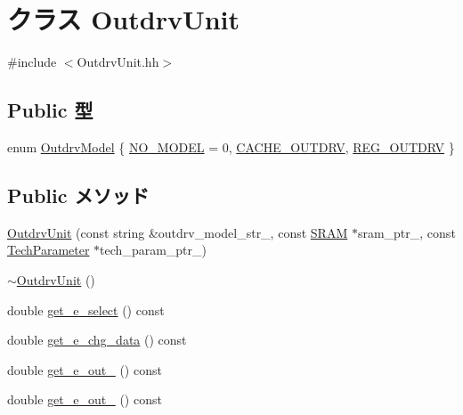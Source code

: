 \hypertarget{classOutdrvUnit}{
\section{クラス OutdrvUnit}
\label{classOutdrvUnit}
}


{\ttfamily \#include $<$OutdrvUnit.hh$>$}\subsection*{Public 型}
\begin{DoxyCompactItemize}
\item 
enum \hyperlink{classOutdrvUnit_acf5fc301c3542e694b0cec063a8d92c5}{OutdrvModel} \{ \hyperlink{classOutdrvUnit_acf5fc301c3542e694b0cec063a8d92c5abab57b6e2c553e4d983f415a1f4ea75b}{NO\_\-MODEL} =  0, 
\hyperlink{classOutdrvUnit_acf5fc301c3542e694b0cec063a8d92c5a3df5c379101c3477a485f8ba66b8b0d9}{CACHE\_\-OUTDRV}, 
\hyperlink{classOutdrvUnit_acf5fc301c3542e694b0cec063a8d92c5a2255e429b4b343fb912571ab95335e89}{REG\_\-OUTDRV}
 \}
\end{DoxyCompactItemize}
\subsection*{Public メソッド}
\begin{DoxyCompactItemize}
\item 
\hyperlink{classOutdrvUnit_a4f6cb5a4cdeb7f2641aafac67261694d}{OutdrvUnit} (const string \&outdrv\_\-model\_\-str\_\-, const \hyperlink{classSRAM}{SRAM} $\ast$sram\_\-ptr\_\-, const \hyperlink{classTechParameter}{TechParameter} $\ast$tech\_\-param\_\-ptr\_\-)
\item 
\hyperlink{classOutdrvUnit_a15b5d7f2cb338c99c4ea07ab71196221}{$\sim$OutdrvUnit} ()
\item 
double \hyperlink{classOutdrvUnit_afa46136b7f2a247b6a04e1c5662f1857}{get\_\-e\_\-select} () const 
\item 
double \hyperlink{classOutdrvUnit_a52d13d5ef1f05b0b97859485ffc0fb6a}{get\_\-e\_\-chg\_\-data} () const 
\item 
double \hyperlink{classOutdrvUnit_ad0ed85e6312b8342e2481cd8170e890d}{get\_\-e\_\-out\_} () const 
\item 
double \hyperlink{classOutdrvUnit_a93a70c4c184a65ff5fc02745ba07a13f}{get\_\-e\_\-out\_} () const 
\end{DoxyCompactItemize}
